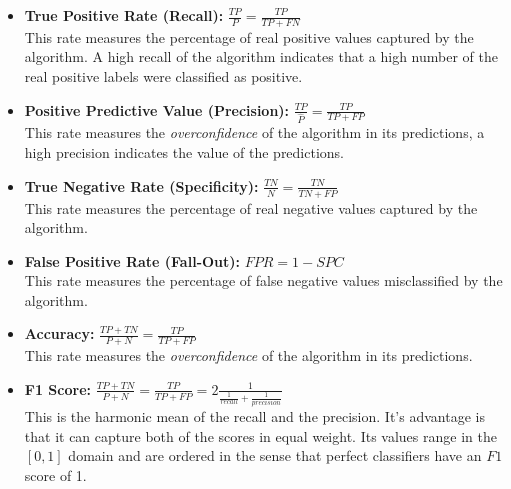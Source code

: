 \begin{itemize}
\item \textbf{True Positive Rate  (Recall):} $\frac{TP}{P} = \frac{TP}{TP + FN}$ \\ This rate measures the percentage of real positive values captured by the algorithm. A high recall of the algorithm indicates that a high number of the real positive labels were classified as positive.


\item \textbf{Positive Predictive Value  (Precision):} $\frac{TP}{\hat{P}} = \frac{TP}{TP + FP}$ \\ This rate measures the \textit{overconfidence} of the algorithm in its predictions, a high precision indicates the value of the predictions.

\item \textbf{True Negative Rate  (Specificity):}  $\frac{TN}{N} = \frac{TN}{TN + FP}$ \\ This rate measures the percentage of real negative values captured by the algorithm.

\item \textbf{False Positive Rate  (Fall-Out):} $FPR = 1 - SPC$ \\ This rate measures the percentage of false negative values misclassified by the algorithm.

\item \textbf{Accuracy:} $\frac{TP + TN}{P + N} = \frac{TP}{TP + FP}$ \\ This rate measures the \textit{overconfidence} of the algorithm in its predictions.

%
\item \textbf{F1  Score:} $\frac{TP + TN}{P + N} = \frac{TP}{TP + FP} = 2 \frac{1}{  \frac{1}{recall} + \frac{1}{precision}  }$ \\ This is the harmonic mean of the recall and the precision. It's advantage is that it can capture both of the scores in equal weight. Its values range in the $[0,1 ]$ domain and are ordered in the sense that perfect classifiers have an $F1$ score of 1.

\end{itemize}


